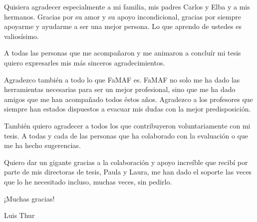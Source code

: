 \documentclass[
11pt, %
oneside, %
english, %
doublespacing, %
nolistspacing, %
parskip, %
parident,
headsepline, %
]{MastersDoctoralThesis} %
\begin{document}

\begin{acknowledgements}

Quisiera agradecer especialmente a mi familia, mis padres Carlos y Elba y a mis hermanos. Gracias por su amor y su apoyo incondicional, gracias por siempre apoyarme y ayudarme a ser una mejor persona. Lo que aprendo de ustedes es valiosísimo.

A todas las personas que me acompañaron y me animaron a concluír mi tesis quiero expresarles mis más sinceros agradecimientos.

Agradezco también a todo lo que FaMAF es. FaMAF no solo me ha dado las herramientas necesarias para ser un mejor profesional, sino que me ha dado amigos que me han acompañado todos éstos años. Agradezco a los profesores que siempre han estados dispuestos a evacuar mis dudas con la mejor predisposición.

 También quiero agradecer a todos los que contribuyeron voluntariamente con mi tesis. A todas y cada de las personas que ha colaborado con la evaluación o que me ha hecho sugerencias.

Quiero dar un gigante gracias a la colaboración y apoyo increíble que recibí por parte de mis directoras de tesis, Paula y Laura, me han dado el soporte las veces que lo he necesitado incluso, muchas veces, sin pedirlo.

\hfill ¡Muchas gracias!

\hfill Luis Thur

\end{acknowledgements}




\end{document}
